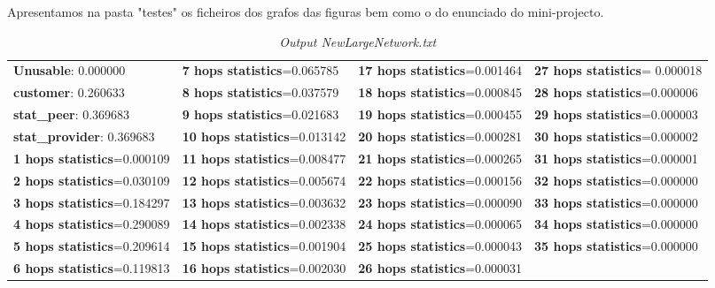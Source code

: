 \documentclass[a4paper]{article}
\begin{document}
Apresentamos na pasta "testes" os ficheiros dos grafos das figuras bem como o do enunciado do mini-projecto.

\begin{table}[h]
\begin{tabularx}{\textwidth}{X X X X}
  \textbf{Unusable}: 0.000000 & \textbf{7 hops statistics}=0.065785 & \textbf{17 hops statistics}=0.001464 & \textbf{27 hops statistics}= 0.000018 \\
  \textbf{customer}: 0.260633 & \textbf{8 hops statistics}=0.037579 &  \textbf{18 hops statistics}=0.000845 & \textbf{28 hops statistics}=0.000006\\ 
  \textbf{stat\_peer}: 0.369683 & \textbf{9 hops statistics}=0.021683 &  \textbf{19 hops statistics}=0.000455 & \textbf{29 hops statistics}=0.000003\\
  \textbf{stat\_provider}: 0.369683 & \textbf{10 hops statistics}=0.013142  & \textbf{20 hops statistics}=0.000281 & \textbf{30 hops statistics}=0.000002\\  
  \textbf{1 hops statistics}=0.000109 & \textbf{11 hops statistics}=0.008477 &  \textbf{21 hops statistics}=0.000265 & \textbf{31 hops statistics}=0.000001\\
  \textbf{2 hops statistics}=0.030109 & \textbf{12 hops statistics}=0.005674 & \textbf{22 hops statistics}=0.000156 & \textbf{32 hops statistics}=0.000000\\
  \textbf{3 hops statistics}=0.184297 & \textbf{13 hops statistics}=0.003632 & \textbf{23 hops statistics}=0.000090 & \textbf{33 hops statistics}=0.000000\\
  \textbf{4 hops statistics}=0.290089 & \textbf{14 hops statistics}=0.002338 & \textbf{24 hops statistics}=0.000065 & \textbf{34 hops statistics}=0.000000\\
  \textbf{5 hops statistics}=0.209614 & \textbf{15 hops statistics}=0.001904 & \textbf{25 hops statistics}=0.000043 & \textbf{35 hops statistics}=0.000000\\
  \textbf{6 hops statistics}=0.119813 & \textbf{16 hops statistics}=0.002030 & \textbf{26 hops statistics}=0.000031 & \\
\end{tabularx}
 \caption{\textit{Output NewLargeNetwork.txt}}
\end{table}

\pagebreak
\end{document}

